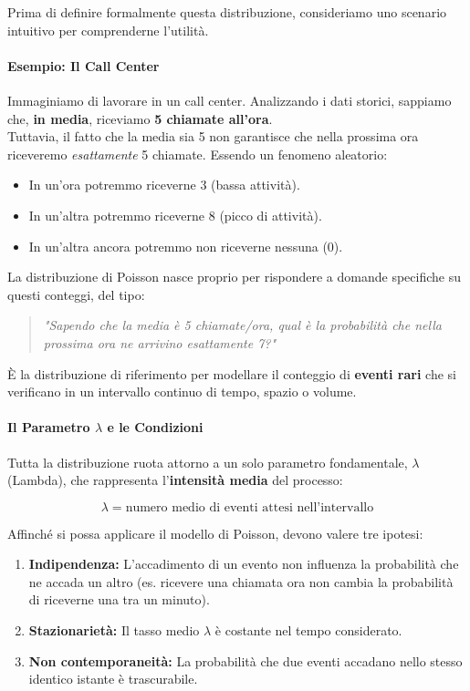 Prima di definire formalmente questa distribuzione, consideriamo uno scenario intuitivo per comprenderne l'utilità.

\paragraph{Esempio: Il Call Center}
Immaginiamo di lavorare in un call center. Analizzando i dati storici, sappiamo che, \textbf{in media}, riceviamo \textbf{5 chiamate all'ora}.
\\Tuttavia, il fatto che la media sia 5 non garantisce che nella prossima ora riceveremo \textit{esattamente} 5 chiamate. Essendo un fenomeno aleatorio:
\begin{itemize}
    \item In un'ora potremmo riceverne 3 (bassa attività).
    \item In un'altra potremmo riceverne 8 (picco di attività).
    \item In un'altra ancora potremmo non riceverne nessuna (0).
\end{itemize}

La distribuzione di Poisson nasce proprio per rispondere a domande specifiche su questi conteggi, del tipo:
\begin{quote}
    \textit{"Sapendo che la media è 5 chiamate/ora, qual è la probabilità che nella prossima ora ne arrivino esattamente 7?"}
\end{quote}

È la distribuzione di riferimento per modellare il conteggio di \textbf{eventi rari} che si verificano in un intervallo continuo di tempo, spazio o volume.

\paragraph{Il Parametro $\lambda$ e le Condizioni}
Tutta la distribuzione ruota attorno a un solo parametro fondamentale, $\lambda$ (Lambda), che rappresenta l'\textbf{intensità media} del processo:

\[ \lambda = \text{numero medio di eventi attesi nell'intervallo} \]

Affinché si possa applicare il modello di Poisson, devono valere tre ipotesi:
\begin{enumerate}
    \item \textbf{Indipendenza:} L'accadimento di un evento non influenza la probabilità che ne accada un altro (es. ricevere una chiamata ora non cambia la probabilità di riceverne una tra un minuto).
    \item \textbf{Stazionarietà:} Il tasso medio $\lambda$ è costante nel tempo considerato.
    \item \textbf{Non contemporaneità:} La probabilità che due eventi accadano nello stesso identico istante è trascurabile.
\end{enumerate}

